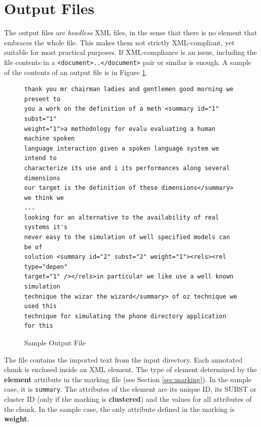 \documentclass{article}
\begin{document}
\section{Output Files}
\label{sec:output}

The output files are \emph{headless} XML files, in the sense that
there is no element that embraces the whole file. This makes them not
strictly XML-compliant, yet suitable for most practical purposes. If
XML-compliance is an issue, including the file contents in a
\texttt{<document>..</document>} pair or similar is enough. A sample
of the contents of an output file is in Figure \ref{fig:output}.

\begin{figure}[ht]

\begin{center}
\begin{minipage}{135mm}
\begin{verbatim}
thank you mr chairman ladies and gentlemen good morning we present to
you a work on the definition of a meth <summary id="1" subst="1"
weight="1">a methodology for evalu evaluating a human machine spoken
language interaction given a spoken language system we intend to
characterize its use and i its performances along several dimensions
our target is the definition of these dimensions</summary> we think we
...
looking for an alternative to the availability of real systems it's
never easy to the simulation of well specified models can be of
solution <summary id="2" subst="2" weight="1"><rels><rel type="depen"
target="1" /></rels>in particular we like use a well known simulation
technique the wizar the wizard</summary> of oz technique we used this
technique for simulating the phone directory application for this
\end{verbatim}
\end{minipage}

\caption{Sample Output File}
\label{fig:output}
\end{center}
\end{figure}

The file contains the imported text from the input directory. Each
annotated chunk is enclosed inside an XML element. The type of element
determined by the \textbf{element} attribute in the marking file (see
Section \ref{sec:marking}). In the sample case, it is
\texttt{summary}. The attributes of the element are its unique ID, its
SUBST or cluster ID (only if the marking is \textbf{clustered}) and
the values for all attributes of the chunk. In the sample case, the
only attribute defined in the marking is \textbf{weight}.
\end{document}
